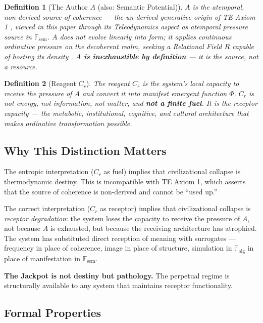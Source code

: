 \documentclass[12pt,a4paper]{article}
\newtheorem{definition}{Definition}[section]
\newcommand{\reag}{C_r}
\newcommand{\Mpot}{A}
\newcommand{\Fsem}{\mathbb{F}_{\mathrm{sem}}}
\newcommand{\Falg}{\mathbb{F}_{\mathrm{alg}}}
\begin{document}
\begin{definition}[The Author $\Mpot$ (also: Semantic Potential)]\label{def:M}
$\Mpot$ is the atemporal, non-derived source of coherence --- the un-derived generative origin of TE Axiom 1 \cite{te_core}, viewed in this paper through its Teleodynamics aspect as atemporal pressure source in $\Fsem$. $\Mpot$ does not evolve linearly into form; it applies continuous ordinative pressure on the decoherent realm, seeking a Relational Field $R$ capable of hosting its density \cite{ost_teleodynamics}. \textbf{$\Mpot$ is inexhaustible by definition} --- it is the source, not a resource.
\end{definition}

\begin{definition}[Reagent $\reag$]\label{def:reagent}
The reagent $\reag$ is the system's \emph{local capacity} to receive the pressure of $\Mpot$ and convert it into manifest emergent function $\Phi$. $\reag$ is not energy, not information, not matter, and \textbf{not a finite fuel}. It is the \emph{receptor capacity} --- the metabolic, institutional, cognitive, and cultural architecture that makes ordinative transformation possible.
\end{definition}

\subsection{Why This Distinction Matters}

The entropic interpretation ($\reag$ as fuel) implies that civilizational collapse is thermodynamic destiny. This is incompatible with TE Axiom 1, which asserts that the source of coherence is non-derived and cannot be ``used up.''

The correct interpretation ($\reag$ as receptor) implies that civilizational collapse is \emph{receptor degradation}: the system loses the capacity to receive the pressure of $\Mpot$, not because $\Mpot$ is exhausted, but because the receiving architecture has atrophied. The system has substituted direct reception of meaning with surrogates --- frequency in place of coherence, image in place of structure, simulation in $\Falg$ in place of manifestation in $\Fsem$.

\textbf{The Jackpot is not destiny but pathology.} The perpetual regime is structurally available to any system that maintains receptor functionality.

\subsection{Formal Properties}
\end{document}
